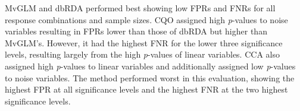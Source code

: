 \documentclass[a4paper,11pt]{article}
\begin{document}

    MvGLM and dbRDA performed best showing low FPRs and FNRs for all response combinations and sample sizes. 
    CQO assigned high \textit{p}-values to noise variables resulting in FPRs lower than those of dbRDA but higher than MvGLM's. 
    However, it had the highest FNR for the lower three significance levels, resulting largely from the high \textit{p}-values of linear variables. 
    CCA also assigned high \textit{p}-values to linear variables and additionally assigned low \textit{p}-values to noise variables. 
    The method performed worst in this evaluation, showing the highest FPR at all significance levels and the highest FNR at the two highest significance levels. \\
	
    
\end{document}

